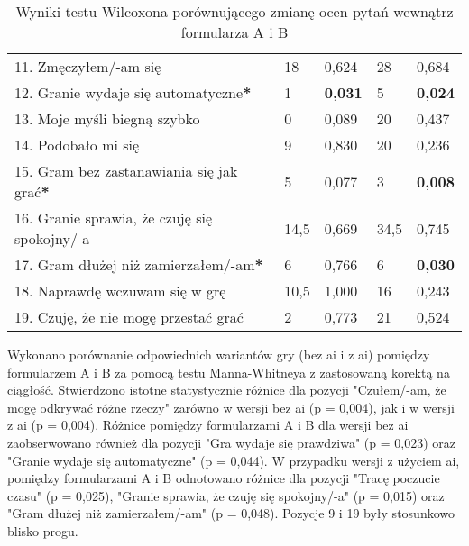 \begin{table}[!h]
\begin{center}
\begin{tabular}{|m{12em}|m{5em}|m{4em}|m{5em}|m{4em}|}
            11. Zmęczyłem/-am się                                             & 18                     & 0,624          & 28                     & 0,684          \\
            12. Granie wydaje się automatyczne\textbf{*}                      & 1                      & \textbf{0,031} & 5                      & \textbf{0,024} \\
            13. Moje myśli \newline biegną szybko                             & 0                      & 0,089          & 20                     & 0,437          \\
            14. Podobało mi się                                               & 9                      & 0,830          & 20                     & 0,236          \\
            15. Gram bez zastanawiania się jak grać\textbf{*}                 & 5                      & 0,077          & 3                      & \textbf{0,008} \\
            16. Granie sprawia, \newline że czuję się spokojny/-a             & 14,5                   & 0,669          & 34,5                   & 0,745          \\
            17. Gram dłużej \newline niż zamierzałem/-am\textbf{*}            & 6                      & 0,766          & 6                      & \textbf{0,030} \\
            18. Naprawdę wczuwam się w grę                                    & 10,5                   & 1,000          & 16                     & 0,243          \\
            19. Czuję, że nie mogę przestać grać                              & 2                      & 0,773          & 21                     & 0,524          \\
            \hline
        \end{tabular}
    \end{center}
    \caption{Wyniki testu Wilcoxona porównującego zmianę ocen pytań wewnątrz formularza A i B}\label{tab1:ch7_13}
\end{table}

\newpage

Wykonano porównanie odpowiednich wariantów gry (bez \gls{ai} i z \gls{ai}) pomiędzy formularzem A i B za pomocą testu
Manna-Whitneya z zastosowaną korektą na ciągłość. Stwierdzono istotne statystycznie różnice dla pozycji "Czułem/-am, że mogę odkrywać różne rzeczy"
zarówno w wersji bez \gls{ai} (p = 0,004), jak i w wersji z \gls{ai} (p = 0,004). Różnice pomiędzy formularzami
A i B dla wersji bez \gls{ai} zaobserwowano również dla pozycji "Gra wydaje się prawdziwa" (p = 0,023) oraz "Granie wydaje
się automatyczne" (p = 0,044). W przypadku wersji z użyciem \gls{ai}, pomiędzy formularzami A i B odnotowano różnice dla
pozycji "Tracę poczucie czasu" (p = 0,025), "Granie sprawia, że czuję się spokojny/-a" (p = 0,015) oraz "Gram
dłużej niż zamierzałem/-am" (p = 0,048). Pozycje 9 i 19 były stosunkowo blisko progu.

